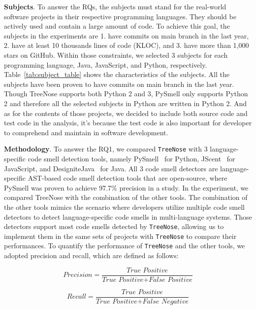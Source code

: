 {\bf Subjects}. To answer the RQs, the subjects must stand for the real-world
software projects in their respective programming languages. They should be
actively used and contain a large amount of code. To achieve this goal, the
subjects in the experiments are 1. have commits on main branch in the last
year, 2. have at least 10 thousands lines of code (KLOC), and 3. have more than
1,000 stars on GitHub. Within those constraints, we selected 3 subjects for
each programming language, Java, JavaScript, and Python, respectively.
Table~\ref{tab:subject_table} shows the characteristics of the subjects. All
the subjects have been proven to have commits on main branch in the last year.
Though TreeNose supports both Python 2 and 3, PySmell only supports Python 2
and therefore all the selected subjects in Python are written in Python 2. And
as for the contents of those projects, we decided to include both source code
and test code in the analysis, it's because the test code is also important for
developer to comprehend and maintain in software development.



{\bf Methodology}. To answer the RQ1, we compared \texttt{TreeNose} with 3
language-specific code smell detection tools, namely PySmell~\cite{Pysmell} for
Python, JScent~\cite{Jscent} for JavaScript, and
DesigniteJava~\cite{DesigniteJava} for Java. All 3 code smell detectors are
language-specific AST-based code smell detection tools that are open-source,
where PySmell was proven to achieve 97.7\% precision in a study. In the
experiment, we compared TreeNose with the combination of the other tools. The
combination of the other tools mimics the scenario where developers utilize
multiple code smell detectors to detect language-specific code smells in
multi-language systems. Those detectors support most code smells detected by
\texttt{TreeNose}, allowing us to implement them in the same sets of projects
with \texttt{TreeNose} to compare their performances. To quantify the
performance of \texttt{TreeNose} and the other tools, we adopted precision and
recall, which are defined as follows:


\begin{equation}
    \textit{Precision} = \frac{\textit{True Positive}}{\textit{True Positive} + \textit{False Positive}}
\end{equation}

\begin{equation}
    \textit{Recall} = \frac{\textit{True Positive}}{\textit{True Positive} + \textit{False Negative}}
\end{equation}


